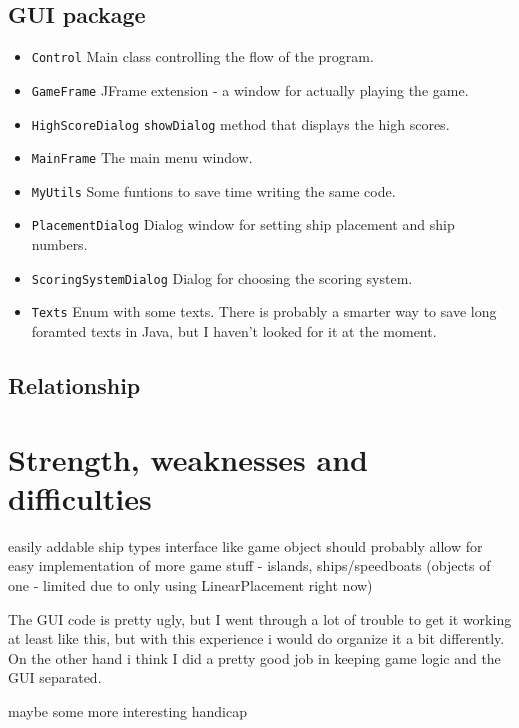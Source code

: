 \documentclass[]{article}
\begin{document}
\subsection{GUI package}

\begin{itemize}
	\item \texttt{Control} Main class controlling the flow of the program.
	\item \texttt{GameFrame} JFrame extension - a window for actually playing the game.
	\item \texttt{HighScoreDialog} \texttt{showDialog} method that displays the high scores.
	\item \texttt{MainFrame} The main menu window.
	\item \texttt{MyUtils} Some funtions to save time writing the same code.
	\item \texttt{PlacementDialog} Dialog window for setting ship placement and ship numbers.
	\item \texttt{ScoringSystemDialog} Dialog for choosing the scoring system.
	\item \texttt{Texts} Enum with some texts. There is probably a smarter way to save long foramted texts in Java, but I haven't looked for it at the moment.
\end{itemize}

\subsection{Relationship}

\section{Strength, weaknesses and difficulties}
easily addable ship types
interface like game object should probably allow for easy implementation of more game stuff - islands, ships/speedboats (objects of one - limited due to only using LinearPlacement right now)

The GUI code is pretty ugly, but I went through a lot of trouble to get it working at least like this, but with this experience i would do organize it a bit differently. On the other hand i think I did a pretty good job in keeping game logic and the GUI separated. 

maybe some more interesting handicap
\end{document}
